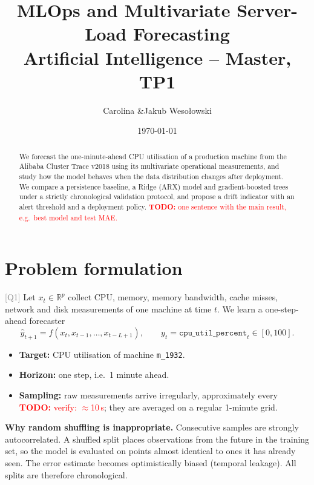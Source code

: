 \documentclass[10pt,a4paper]{article}
\title{\textbf{MLOps and Multivariate Server-Load Forecasting}\\[2pt]
  \large Artificial Intelligence -- Master, TP1}
\author{Carolina \todo{surname} \quad\&\quad Jakub Weso\l{}owski}
\date{\today}
\newcommand{\todo}[1]{\textcolor{red}{\textbf{TODO:} #1}}
\newcommand{\q}[1]{\textcolor{gray}{\small[#1]}}
\newcommand{\code}[1]{\texttt{#1}}
\begin{document}
\maketitle
\vspace{-1.5em}

\begin{abstract}
\noindent We forecast the one-minute-ahead CPU utilisation of a production machine from the
Alibaba Cluster Trace v2018 using its multivariate operational measurements, and study how the
model behaves when the data distribution changes after deployment. We compare a persistence
baseline, a Ridge (ARX) model and gradient-boosted trees under a strictly chronological
validation protocol, and propose a drift indicator with an alert threshold and a deployment policy.
\todo{one sentence with the main result, e.g.\ best model and test MAE.}
\end{abstract}

\section{Problem formulation}\label{sec:problem}
\q{Q1}
Let $x_t \in \mathbb{R}^p$ collect CPU, memory, memory bandwidth, cache misses, network and disk
measurements of one machine at time $t$. We learn a one-step-ahead forecaster
\begin{equation}
  \hat y_{t+1} = f\!\left(x_t, x_{t-1}, \dots, x_{t-L+1}\right), \qquad y_t = \code{cpu\_util\_percent}_t \in [0,100].
\end{equation}
\begin{itemize}
  \item \textbf{Target:} CPU utilisation of machine \code{m\_1932}.
  \item \textbf{Horizon:} one step, i.e.\ 1 minute ahead.
  \item \textbf{Sampling:} raw measurements arrive irregularly, approximately every
        \todo{verify: $\approx$10\,s}; they are averaged on a regular 1-minute grid.
\end{itemize}
\textbf{Why random shuffling is inappropriate.} Consecutive samples are strongly autocorrelated.
A shuffled split places observations from the future in the training set, so the model is
evaluated on points almost identical to ones it has already seen. The error estimate becomes
optimistically biased (temporal leakage). All splits are therefore chronological.

\end{document}
